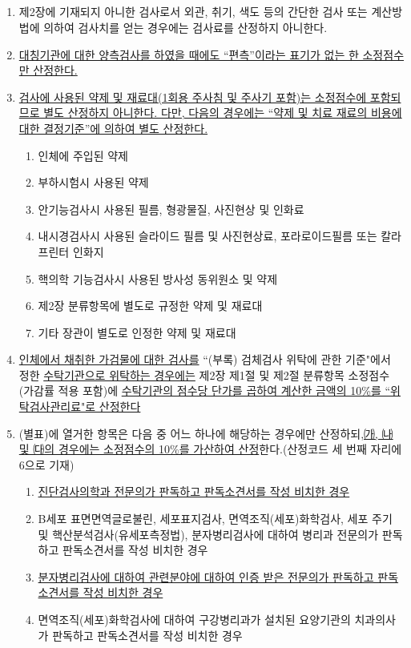 \subsection{}
\begin{enumerate}[(1)]\tightlist
\item 제2장에 기재되지 아니한 검사로서 외관, 취기, 색도 등의 간단한 검사 또는 계산방법에 의하여 검사치를 얻는 경우에는 검사료를 산정하지 아니한다.
\item \uline{대칭기관에 대한 양측검사를 하였을 때에도 “편측”이라는 표기가 없는 한 소정점수만 산정한다.}
\item \uline{검사에 사용된 약제 및 재료대(1회용 주사침 및 주사기 포함)는 소정점수에 포함되므로 별도 산정하지 아니한다. 다만, 다음의 경우에는 “약제 및 치료 재료의 비용에 대한 결정기준”에 의하여 별도 산정한다.}
	\begin{enumerate}[(가)]\tightlist
	\item 인체에 주입된 약제
	\item 부하시험시 사용된 약제
	\item 안기능검사시 사용된 필름, 형광물질, 사진현상 및 인화료
	\item 내시경검사시 사용된 슬라이드 필름 및 사진현상료, 포라로이드필름 또는 칼라프린터 인화지
	\item 핵의학 기능검사시 사용된 방사성 동위원소 및 약제
	\item 제2장 분류항목에 별도로 규정한 약제 및 재료대
	\item 기타 장관이 별도로 인정한 약제 및 재료대
	\end{enumerate}
\item \uline{인체에서 채취한 가검물에 대한 검사를} “(부록) 검체검사 위탁에 관한 기준"에서 정한 \uline{수탁기관으로 위탁하는 경우에는} 제2장 제1절 및 제2절 분류항목 소정점수(가감률 적용 포함)에 \uline{수탁기관의 점수당 단가를 곱하여 계산한 금액의 10\%를 “위탁검사관리료"로 산정한다}
\item (별표)에 열거한 항목은 다음 중 어느 하나에 해당하는 경우에만 산정하되,\uline{㈎, ㈏ 및 ㈐의 경우에는 소정점수의 10\%를 가산하여 산정}한다.(산정코드 세 번째 자리에 6으로 기재)
	\begin{enumerate}[(가)]\tightlist
	\item \uline{진단검사의학과 전문의가 판독하고 판독소견서를 작성\cntrdot{} 비치한 경우}
	\item B세포 표면면역글로불린, 세포표지검사, 면역조직(세포)화학검사, 세포 주기 및 핵산분석검사(유세포측정법), 분자병리검사에 대하여 병리과 전문의가 판독하고 판독소견서를 작성\cntrdot{} 비치한 경우
	\item \uline{분자병리검사에 대하여 관련분야에 대하여 인증 받은 전문의가 판독하고 판독소견서를 작성\cntrdot{} 비치한 경우}
	\item 면역조직(세포)화학검사에 대하여 구강병리과가 설치된 요양기관의 치과의사가 판독하고 판독소견서를 작성\cntrdot{} 비치한 경우
	\end{enumerate}
\end{enumerate}
	
